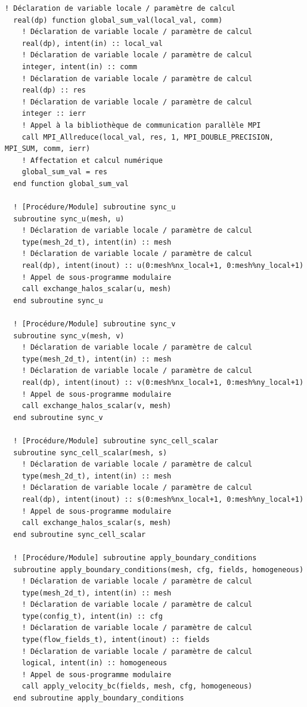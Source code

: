 \documentclass[10pt,a4paper,oneside]{book}
\begin{document}
\begin{lstlisting}[language={[95]Fortran}]
  ! Déclaration de variable locale / paramètre de calcul
  real(dp) function global_sum_val(local_val, comm)
    ! Déclaration de variable locale / paramètre de calcul
    real(dp), intent(in) :: local_val
    ! Déclaration de variable locale / paramètre de calcul
    integer, intent(in) :: comm
    ! Déclaration de variable locale / paramètre de calcul
    real(dp) :: res
    ! Déclaration de variable locale / paramètre de calcul
    integer :: ierr
    ! Appel à la bibliothèque de communication parallèle MPI
    call MPI_Allreduce(local_val, res, 1, MPI_DOUBLE_PRECISION, MPI_SUM, comm, ierr)
    ! Affectation et calcul numérique
    global_sum_val = res
  end function global_sum_val

  ! [Procédure/Module] subroutine sync_u
  subroutine sync_u(mesh, u)
    ! Déclaration de variable locale / paramètre de calcul
    type(mesh_2d_t), intent(in) :: mesh
    ! Déclaration de variable locale / paramètre de calcul
    real(dp), intent(inout) :: u(0:mesh%nx_local+1, 0:mesh%ny_local+1)
    ! Appel de sous-programme modulaire
    call exchange_halos_scalar(u, mesh)
  end subroutine sync_u

  ! [Procédure/Module] subroutine sync_v
  subroutine sync_v(mesh, v)
    ! Déclaration de variable locale / paramètre de calcul
    type(mesh_2d_t), intent(in) :: mesh
    ! Déclaration de variable locale / paramètre de calcul
    real(dp), intent(inout) :: v(0:mesh%nx_local+1, 0:mesh%ny_local+1)
    ! Appel de sous-programme modulaire
    call exchange_halos_scalar(v, mesh)
  end subroutine sync_v

  ! [Procédure/Module] subroutine sync_cell_scalar
  subroutine sync_cell_scalar(mesh, s)
    ! Déclaration de variable locale / paramètre de calcul
    type(mesh_2d_t), intent(in) :: mesh
    ! Déclaration de variable locale / paramètre de calcul
    real(dp), intent(inout) :: s(0:mesh%nx_local+1, 0:mesh%ny_local+1)
    ! Appel de sous-programme modulaire
    call exchange_halos_scalar(s, mesh)
  end subroutine sync_cell_scalar

  ! [Procédure/Module] subroutine apply_boundary_conditions
  subroutine apply_boundary_conditions(mesh, cfg, fields, homogeneous)
    ! Déclaration de variable locale / paramètre de calcul
    type(mesh_2d_t), intent(in) :: mesh
    ! Déclaration de variable locale / paramètre de calcul
    type(config_t), intent(in) :: cfg
    ! Déclaration de variable locale / paramètre de calcul
    type(flow_fields_t), intent(inout) :: fields
    ! Déclaration de variable locale / paramètre de calcul
    logical, intent(in) :: homogeneous
    ! Appel de sous-programme modulaire
    call apply_velocity_bc(fields, mesh, cfg, homogeneous)
  end subroutine apply_boundary_conditions


\end{lstlisting}
\end{document}
